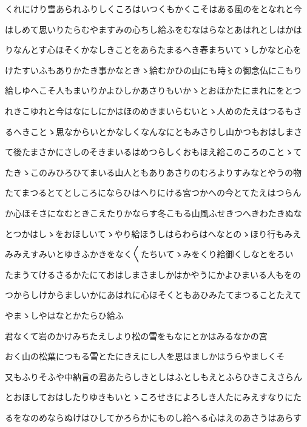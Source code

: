 \documentclass[a4paper,11pt,landscape]{ltjtarticle}
\begin{document}
\par\medskip
くれにけり雪あられふりしくころはいつくもかくこそはある風のをとなれと今
\par\medskip
はしめて思いりたらむやますみの心ちし給ふをむなはらなとあはれとしはかは
\par\medskip
りなんとす心ほそくかなしきことをあらたまるへき春まちいてゝしかなと心を
\par\medskip
けたすいふもありかたき事かなときゝ給むかひの山にも時〻の御念仏にこもり
\par\medskip
給しゆへこそ人もまいりかよひしかあさりもいかゝとおほかたにまれにをとつ
\par\medskip
れきこゆれと今はなにしにかはほのめきまいらむいとゝ人めのたえはつるもさ
\par\medskip
るへきことゝ思なからいとかなしくなんなにともみさりし山かつもおはしまさ
\par\medskip
て後たまさかにさしのそきまいるはめつらしくおもほえ給このころのことゝて
\par\medskip
たきゝこのみひろひてまいる山人ともありあさりのむろよりすみなとやうの物
\par\medskip
たてまつるとてとしころにならひはへりにける宮つかへの今とてたえはつらん
\par\medskip
か心ほそさになむときこえたりかならす冬こもる山風ふせきつへきわたきぬな
\par\medskip
とつかはしゝをおほしいてゝやり給ほうしはらわらはへなとのゝほり行もみえ
\par\medskip
みみえすみいとゆきふかきをなく〱たちいてゝみをくり給御くしなとをろい
\par\medskip
たまうてけるさるかたにておはしまさましかはかやうにかよひまいる人もをの
\par\medskip
つからしけからましいかにあはれに心ほそくともあひみたてまつることたえて
\par\medskip
やまゝしやはなとかたらひ給ふ
\par\medskip
君なくて岩のかけみちたえしより松の雪をもなにとかはみるなかの宮
\par\medskip
おく山の松葉につもる雪とたにきえにし人を思はましかはうらやましくそ
\par\medskip
又もふりそふや中納言の君あたらしきとしはふとしもえとふらひきこえさらん
\par\medskip
とおほしておはしたりゆきもいとゝころせきによろしき人たにみえすなりにた
\par\medskip
るをなのめならぬけはひしてかろらかにものし給へる心はえのあさうはあらす
\par\medskip
\end{document}
